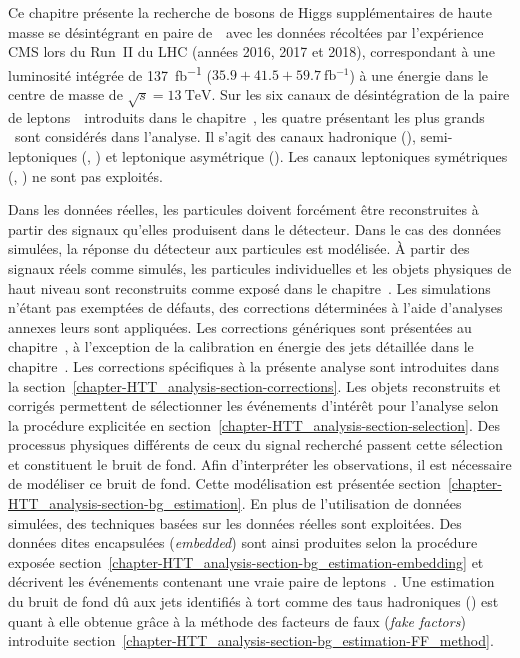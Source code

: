 Ce chapitre présente la
recherche de bosons de Higgs supplémentaires de haute masse se désintégrant en paire de~\tau\
avec les données récoltées par l'expérience CMS
lors du Run~II du LHC (années 2016, 2017 et 2018),
correspondant à une luminosité intégrée de \SI{137}{\femto\barn^{-1}} ($\num{35.9}+\num{41.5}+\SI{59.7}{\femto\barn^{-1}}$)
à une énergie dans le centre de masse de $\sqrt{s}=\SI{13}{\TeV}$.
Sur les six canaux de désintégration de la paire de leptons~\tau\ introduits dans le chapitre~,
les quatre présentant les plus grands \BR\ sont considérés dans l'analyse.
Il s'agit des canaux
hadronique (\tauh\tauh),
semi-leptoniques (\mu\tauh, \ele\tauh)
et
leptonique asymétrique (\ele\mu).
Les canaux leptoniques symétriques (\mu\mu, \ele\ele) ne sont pas exploités.
\par
Dans les données réelles, les particules doivent forcément être reconstruites à partir des signaux qu'elles produisent dans le détecteur.
Dans le cas des données simulées, la réponse du détecteur aux particules est modélisée.
À partir des signaux réels comme simulés, les particules individuelles et les objets physiques de haut niveau sont reconstruits comme exposé dans le chapitre~.
Les simulations n'étant pas exemptées de défauts, des corrections déterminées à l'aide d'analyses annexes leurs sont appliquées.
Les corrections génériques sont présentées au chapitre~\refChLHCCMS,
à l'exception de la calibration en énergie des jets détaillée dans le chapitre~.
Les corrections spécifiques à la présente analyse sont introduites dans la section~\ref{chapter-HTT_analysis-section-corrections}.
Les objets reconstruits et corrigés permettent de sélectionner les événements d'intérêt pour l'analyse selon la procédure explicitée en section~\ref{chapter-HTT_analysis-section-selection}.
Des processus physiques différents de ceux du signal recherché passent cette sélection et constituent le bruit de fond.
Afin d'interpréter les observations, il est nécessaire de modéliser ce bruit de fond.
Cette modélisation est présentée section~\ref{chapter-HTT_analysis-section-bg_estimation}.
En plus de l'utilisation de données simulées, des techniques basées sur les données réelles sont exploitées.
Des données dites \og encapsulées \fg{} (\emph{embedded}) sont ainsi produites selon la procédure exposée section~\ref{chapter-HTT_analysis-section-bg_estimation-embedding} et décrivent les événements contenant une vraie paire de leptons~\tau.
Une estimation du bruit de fond dû aux jets identifiés à tort comme des taus hadroniques (\ftauhs) est quant à elle obtenue grâce à la méthode des facteurs de faux (\emph{fake factors}) introduite section~\ref{chapter-HTT_analysis-section-bg_estimation-FF_method}.
